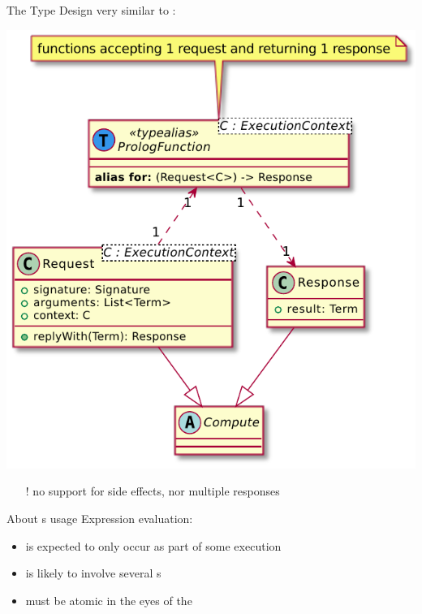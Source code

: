 \documentclass[handout]{beamer}
\begin{document}
\begin{frame}[allowframebreaks]{The  Type}
    Design very similar to :
    \begin{center}
        \includegraphics[height=.7\textheight]{img/function.pdf}
    \end{center}
    \begin{itemize}
        \item[!] no support for side effects, nor multiple responses
    \end{itemize}

    \framebreak


    \framebreak

    \begin{alertblock}{About s usage}
        Expression evaluation:
        \begin{itemize}
            \item is expected to \alert{only} occur as part of some  execution
            \item is likely to involve \alert{several} s
            \item must be \alert{atomic} in the eyes of the 
        \end{itemize}
    \end{alertblock}


\end{frame}
\end{document}
